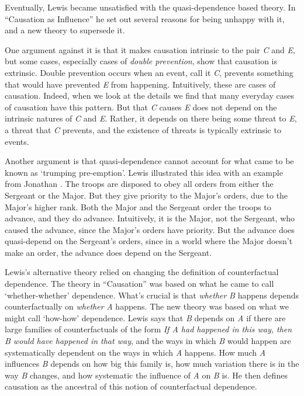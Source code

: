 Eventually, Lewis became unsatisfied with the quasi-dependence based theory. In ``Causation as Influence'' \citeyearpar{Lewis2000a, Lewis2004a} he set out several reasons for being unhappy with it, and a new theory to supersede it.

One argument against it is that it makes causation intrinsic to the pair \textit{C} and \textit{E}, but some cases, especially cases of \textit{double prevention}, show that causation is extrinsic. Double prevention occurs when an event, call it \textit{C}, prevents something that would have prevented \textit{E} from happening. Intuitively, these are cases of causation. Indeed, when we look at the details we find that many everyday cases of causation have this pattern. But that \textit{C} causes \textit{E} does not depend on the intrinsic natures of \textit{C} and \textit{E}. Rather, it depends on there being some threat to \textit{E}, a threat that \textit{C} prevents, and the existence of threats is typically extrinsic to events.

Another argument is that quasi-dependence cannot account for what came to be known as `trumping pre-emption'. Lewis illustrated this idea with an example from Jonathan \citet{Schaffer2000}. The troops are disposed to obey all orders from either the Sergeant or the Major. But they give priority to the Major's orders, due to the Major's higher rank. Both the Major and the Sergeant order the troops to advance, and they do advance. Intuitively, it is the Major, not the Sergeant, who caused the advance, since the Major's orders have priority. But the advance does quasi-depend on the Sergeant's orders, since in a world where the Major doesn't make an order, the advance does depend on the Sergeant.

Lewis's alternative theory relied on changing the definition of counterfactual dependence. The theory in ``Causation'' was based on what he came to call `whether-whether' dependence. What's crucial is that \textit{whether} \textit{B} happens depends counterfactually on \textit{whether} \textit{A} happens. The new theory was based on what we might call `how-how' dependence. Lewis says that \textit{B} depends on \textit{A} if there are large families of counterfactuals of the form \textit{If \textit{A} had happened in this way, then \textit{B} would have happened in that way}, and the ways in which \textit{B} would happen are systematically dependent on the ways in which \textit{A} happens. How much \textit{A} influences \textit{B} depends on how big this family is, how much variation there is in the way \textit{B} changes, and how systematic the influence of \textit{A} on \textit{B} is. He then defines causation as the ancestral of this notion of counterfactual dependence.

